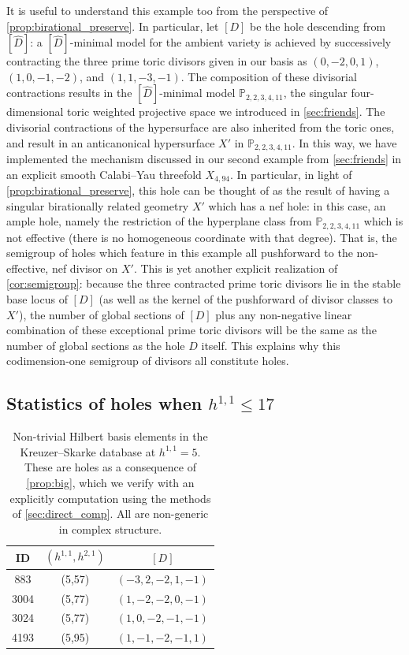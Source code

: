 \documentclass[11pt,dvipsnames]{article}
\theoremstyle{definition}
\begin{document}
It is useful to understand this example too from the perspective of \cref{prop:birational_preserve}. In particular, let $[D]$ be the hole descending from $[\hat{D}]$: a $[\hat{D}]$-minimal model for the ambient variety is achieved by successively contracting the three prime toric divisors given in our basis as $(0, -2, 0, 1)$, $(1, 0, -1, -2)$, and $(1, 1, -3, -1)$. The composition of these divisorial contractions results in the $[\hat{D}]$-minimal model $\mathbb{P}_{2,2,3,4,11}$, the singular four-dimensional toric weighted projective space we introduced in \cref{sec:friends}. The divisorial contractions of the hypersurface are also inherited from the toric ones, and result in an anticanonical hypersurface $X'$ in $\mathbb{P}_{2,2,3,4,11}$. In this way, we have implemented the mechanism discussed in our second example from \cref{sec:friends} in an explicit smooth Calabi--Yau threefold $X_{4,94}$. In particular, in light of \cref{prop:birational_preserve}, this hole can be thought of as the result of having a singular birationally related geometry $X'$ which has a nef hole: in this case, an ample hole, namely the restriction of the hyperplane class from $\mathbb{P}_{2,2,3,4,11}$ which is not effective (there is no homogeneous coordinate with that degree). That is, the semigroup of holes which feature in this example all pushforward to the non-effective, nef divisor on $X'$. This is yet another explicit realization of \cref{cor:semigroup}: because the three contracted prime toric divisors lie in the stable base locus of $[D]$ (as well as the kernel of the pushforward of divisor classes to $X'$), the number of global sections of $[D]$ plus any non-negative linear combination of these exceptional prime toric divisors will be the same as the number of global sections as the hole $D$ itself. This explains why this codimension-one semigroup of divisors all constitute holes. 

\subsection{Statistics of holes when $h^{1,1} \leq 17$}

\begin{table}
    \centering
    \begin{tabular}{c|c|c}
    ID & $(h^{1,1},h^{2,1})$ & $[D]$ \\ 
    \hline
    883 & (5,57) & $(-3, 2, -2, 1, -1)$ \\ 
    3004 & (5,77) & $(1, -2, -2, 0, -1)$ \\ 
    3024 & (5,77) & $(1, 0, -2, -1, -1)$ \\ 
    4193 & (5,95) & $(1, -1, -2, -1, 1)$ \\ 
    \end{tabular}
    \caption{Non-trivial Hilbert basis elements in the Kreuzer--Skarke database at $h^{1,1}=5$. These are holes as a consequence of \cref{prop:big}, which we verify with an explicitly computation using the methods of \cref{sec:direct_comp}. All are non-generic in complex structure.
    }
    \label{tab:h11=5}
\end{table}
\end{document}
